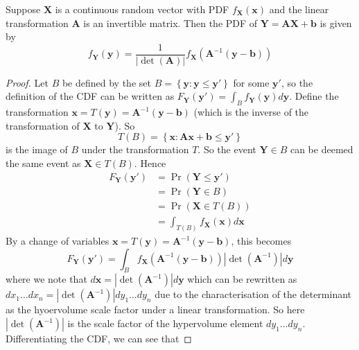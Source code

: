 \documentclass[11pt]{report} %
\begin{document}
Suppose $\mathbf{X}$ is a continuous random vector with PDF $f_{\mathbf{X}}\left(\mathbf{x}\right)$ and the linear transformation $\mathbf{A}$ is an invertible matrix. Then the PDF of $\mathbf{Y} = \mathbf{AX}+\mathbf{b}$ is given by
\begin{equation}
f_{\mathbf{Y}}\left(\mathbf{y}\right) = \dfrac{1}{\left|\operatorname{det}\left(\mathbf{A}\right)\right|}f_{\mathbf{X}}\left(\mathbf{A}^{-1}\left(\mathbf{y} - \mathbf{b}\right)\right)
\end{equation}
\begin{proof}
Let $B$ be defined by the set $B = \left\{\mathbf{y}: \mathbf{y} \leq \mathbf{y}'\right\}$ for some $\mathbf{y}'$, so the definition of the CDF can be written as $F_{\mathbf{Y}}\left(\mathbf{y}'\right) = \int_{B}f_{\mathbf{Y}}\left(\mathbf{y}\right)d\mathbf{y}$. Define the transformation $\mathbf{x} = T\left(\mathbf{y}\right) = \mathbf{A}^{-1}\left(\mathbf{y} - \mathbf{b}\right)$ (which is the inverse of the transformation of $\mathbf{X}$ to $\mathbf{Y}$). So
\begin{equation}
T\left(B\right) = \left\{\mathbf{x}: \mathbf{Ax} + \mathbf{b} \leq \mathbf{y}'\right\}
\end{equation}
is the image of $B$ under the transformation $T$. So the event $\mathbf{Y} \in B$ can be deemed the same event as $\mathbf{X} \in T\left(B\right)$. Hence
\begin{align}
F_{\mathbf{Y}}\left(\mathbf{y}'\right) &= \operatorname{Pr}\left(\mathbf{Y} \leq \mathbf{y}'\right) \\
&= \operatorname{Pr}\left(\mathbf{Y} \in B\right) \\
&= \operatorname{Pr}\left(\mathbf{X} \in T\left(B\right)\right) \\
&= \int_{T\left(B\right)}f_{\mathbf{X}}\left(\mathbf{x}\right)d\mathbf{x}
\end{align}
By a change of variables $\mathbf{x} = T\left(\mathbf{y}\right) = \mathbf{A}^{-1}\left(\mathbf{y} - \mathbf{b}\right)$, this becomes
\begin{equation}
F_{\mathbf{Y}}\left(\mathbf{y}'\right) = \int_{B}f_{\mathbf{X}}\left(\mathbf{A}^{-1}\left(\mathbf{y} - \mathbf{b}\right)\right)\left|\operatorname{det}\left(\mathbf{A}^{-1}\right)\right|d\mathbf{y}
\end{equation}
where we note that $d\mathbf{x} = \left|\operatorname{det}\left(\mathbf{A}^{-1}\right)\right|d\mathbf{y}$ which can be rewritten as $dx_{1}\dots dx_{n} = \left|\operatorname{det}\left(\mathbf{A}^{-1}\right)\right|dy_{1}\dots dy_{n}$ due to the characterisation of the determinant as the hyoervolume scale factor under a linear transformation. So here $\left|\operatorname{det}\left(\mathbf{A}^{-1}\right)\right|$ is the scale factor of the hypervolume element $dy_{1}\dots dy_{n}$. Differentiating the CDF, we can see that

\end{proof}
\end{document}
